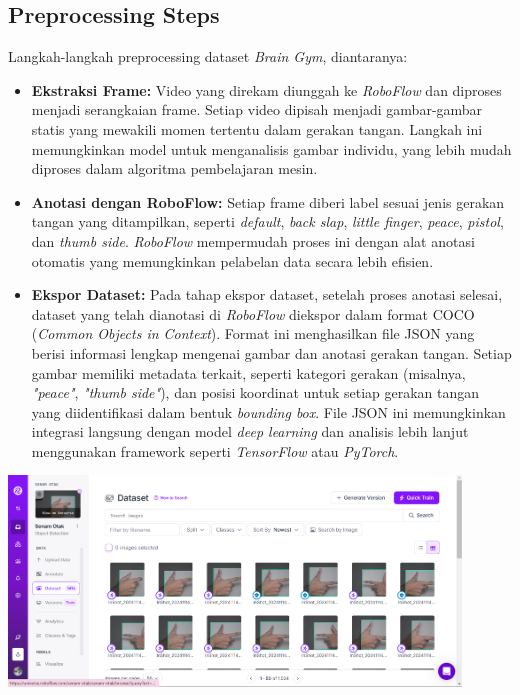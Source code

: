 \documentclass[12pt,a4paper]{article}
\begin{document}
\subsection{Preprocessing Steps}
Langkah-langkah preprocessing dataset \textit{Brain Gym}, diantaranya:

\begin{itemize}
    \item \textbf{Ekstraksi Frame:} 
    Video yang direkam diunggah ke \textit{RoboFlow} dan diproses menjadi serangkaian frame. Setiap video dipisah menjadi gambar-gambar statis yang mewakili momen tertentu dalam gerakan tangan. Langkah ini memungkinkan model untuk menganalisis gambar individu, yang lebih mudah diproses dalam algoritma pembelajaran mesin.
    
    \item \textbf{Anotasi dengan RoboFlow:} 
    Setiap frame diberi label sesuai jenis gerakan tangan yang ditampilkan, seperti \textit{default}, \textit{back slap}, \textit{little finger}, \textit{peace}, \textit{pistol}, dan \textit{thumb side}. \textit{RoboFlow} mempermudah proses ini dengan alat anotasi otomatis yang memungkinkan pelabelan data secara lebih efisien.
    
    \item \textbf{Ekspor Dataset:} 
    Pada tahap ekspor dataset, setelah proses anotasi selesai, dataset yang telah dianotasi di \textit{RoboFlow} diekspor dalam format COCO (\textit{Common Objects in Context}). Format ini menghasilkan file JSON yang berisi informasi lengkap mengenai gambar dan anotasi gerakan tangan. Setiap gambar memiliki metadata terkait, seperti kategori gerakan (misalnya, \textit{"peace"}, \textit{"thumb side"}), dan posisi koordinat untuk setiap gerakan tangan yang diidentifikasi dalam bentuk \textit{bounding box}. File JSON ini memungkinkan integrasi langsung dengan model \textit{deep learning} dan analisis lebih lanjut menggunakan framework seperti \textit{TensorFlow} atau \textit{PyTorch}.
\end{itemize}

\begin{center}
    \includegraphics[width=0.9\textwidth]{images/1.png}
\end{center}
\end{document}
